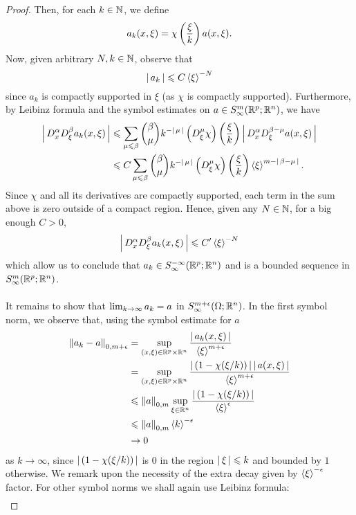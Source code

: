 \documentclass[12pt]{article}
\begin{document}
\begin{proof}
    Then, for each $k \in \N$, we define
    \[
    a_k(x, \xi) = \chi\brac{\frac{\xi}{k}} a (x, \xi). 
    \]
    Now, given arbitrary $N, k \in \N$, observe that 
    \[
    \abs{a_k} \leq C \sym[\xi]^{-N} 
    \]
    since $a_k$ is compactly supported in $\xi$ (as $\chi$ is compactly supported). Furthermore, by Leibinz formula and the symbol estimates on $a \in S^{m}_\infty(\R^p; \R^n)$, we have
    \begin{align*}
        \abs{D^\alpha_x D^\beta_\xi a_k(x, \xi)} 
        & \leq \sum_{\mu \leq \beta} \binom{\beta}{\mu}k^{-\abs{\mu}} \brac{D^\mu_\xi \chi}\brac{\frac{\xi}{k}} \abs{D^\alpha_x D^{\beta - \mu}_\xi a(x, \xi) } \\
        & \leq C \sum_{\mu \leq \beta} \binom{\beta}{\mu}k^{-\abs{\mu}} \brac{D^\mu_\xi \chi}\brac{\frac{\xi}{k}} \sym[\xi]^{m - \abs{\beta - \mu}}. 
    \end{align*}
    Since $\chi$ and all its derivatives are compactly supported, each term in the sum above is zero outside of a compact region. Hence, given any $N \in \N$, for a big enough $C > 0$, 
    \[
    \abs{D^\alpha_x D^\beta_\xi a_k(x, \xi)} \leq C' \sym[\xi]^{-N}
    \]
    which allow us to conclude that $a_k \in S^{-\infty}_\infty(\R^p; \R^n)$ and is a bounded sequence in $S^{m}_\infty(\R^{p}; \R^n)$.\\
    \\
    It remains to show that $\Lim[k] a_k = a $ in $S^{m + \epsilon}_\infty(\Omega; \R^n)$. In the first symbol norm, we observe that, using the symbol estimate for $a$ 
    \begin{align*}
        \norm[a_k - a]_{0, m + \epsilon} 
        & = \sup_{(x, \xi) \in \R^p \times \R^n} \frac{\abs{a_k(x, \xi)}}{\sym[\xi]^{m + \epsilon}} \\
        & = \sup_{(x, \xi) \in \R^p \times \R^n} \frac{\abs{(1- \chi(\xi/k))} \abs{a(x, \xi)}}{\sym[\xi]^{m + \epsilon}} \\
        & \leq \norm[a]_{0, m} \sup_{\xi \in \R^n} \frac{\abs{(1- \chi(\xi/k))}}{\sym[\xi]^{\epsilon}} \\
        & \leq \norm[a]_{0, m} \sym[k]^{- \epsilon}\\
        & \to 0
    \end{align*}
    as $k \to \infty$, since $\abs{( 1- \chi(\xi/ k))}$ is 0 in the region $\abs{\xi} \leq k$ and bounded by $1$ otherwise.  We remark upon the necessity of the extra decay given by $\sym[\xi]^{-\epsilon}$ factor. For other symbol norms we shall again use Leibinz formula: 
    \begin{align*}

\end{align*}
\end{proof}
\end{document}
